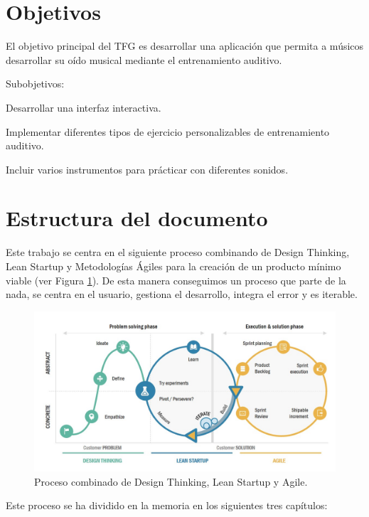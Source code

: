 \documentclass[12pt,twoside,titlepage]{report}
\begin{document}
\section{Objetivos}

El objetivo principal del TFG es desarrollar una aplicación que permita a músicos desarrollar su oído musical mediante el entrenamiento auditivo.

Subobjetivos:
\begin{compactitem}
    \item Desarrollar una interfaz interactiva.
    \item Implementar diferentes tipos de ejercicio personalizables de entrenamiento auditivo. 
    \item Incluir varios instrumentos para prácticar con diferentes sonidos.
\end{compactitem}

\section{Estructura del documento}

Este trabajo se centra en el siguiente proceso combinando de Design Thinking, Lean Startup y Metodologías Ágiles para la creación de un producto mínimo viable (ver Figura \ref{fig:LeanDesignAgile}). De esta manera conseguimos un proceso que parte de la nada, se centra en el usuario, gestiona el desarrollo, integra el error y es iterable.
\cite{estructura}

\begin{figure}[H] 
    \includegraphics[scale=0.46]{LeanDesignAgile}
    \centering
    \caption{Proceso combinado de Design Thinking, Lean Startup y Agile.}
    \label{fig:LeanDesignAgile}
\end{figure}

Este proceso se ha dividido en la memoria en los siguientes tres capítulos:
\end{document}
